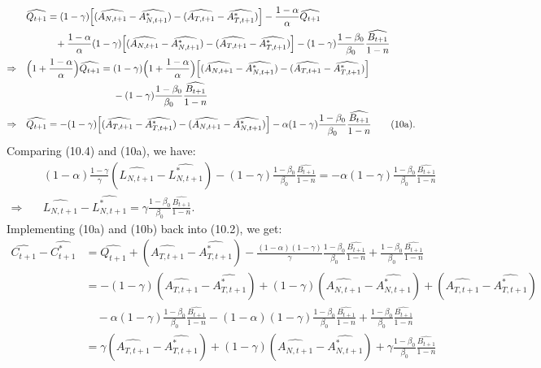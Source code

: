 \documentclass[a4paper,12pt]{article} %
\theoremstyle{nonitalic}
\begin{document}
\begin{align*}
    & \quad \widehat{Q_{t+1}} = (1-\gamma) \Bigl[ (\widehat{A_{N,t+1}} - \widehat{A_{N,t+1}^*}) - (\widehat{A_{T,t+1}} - \widehat{A_{T,t+1}^*}) \Bigr] - \frac{1-\alpha}{\alpha} \widehat{Q_{t+1}} \\
    &\quad\quad\quad\quad+ \frac{1-\alpha}{\alpha} (1-\gamma) \Bigl[ (\widehat{A_{N,t+1}} - \widehat{A_{N,t+1}^*}) - (\widehat{A_{T,t+1}} - \widehat{A_{T,t+1}^*}) \Bigr] - (1-\gamma) \frac{1-\beta_0}{\beta_0} \frac{\widehat{B_{t+1}}}{1-n} \\
    \Rightarrow & \quad \Bigl( 1 + \frac{1-\alpha}{\alpha} \Bigr) \widehat{Q_{t+1}} = (1-\gamma) \Bigl(1 + \frac{1-\alpha}{\alpha} \Bigr) \Bigl[ (\widehat{A_{N,t+1}} - \widehat{A_{N,t+1}^*}) - (\widehat{A_{T,t+1}} - \widehat{A_{T,t+1}^*}) \Bigr] \\
    &\quad\quad\quad\quad\quad\quad\quad\quad\quad\quad - (1-\gamma) \frac{1-\beta_0}{\beta_0} \frac{\widehat{B_{t+1}}}{1-n} \\
    \Rightarrow & \quad \widehat{Q_{t+1}} = -(1-\gamma) \Bigl[ (\widehat{A_{T,t+1}} - \widehat{A_{T,t+1}^*}) - (\widehat{A_{N,t+1}} - \widehat{A_{N,t+1}^*}) \Bigr] - \alpha (1-\gamma) \frac{1-\beta_0}{\beta_0} \frac{\widehat{B_{t+1}}}{1-n} \tag{10a}.
\end{align*}
Comparing (10.4) and (10a), we have:
\begin{align*}
    & \quad (1-\alpha) \frac{1-\gamma}{\gamma} (\widehat{L_{N,t+1}} - \widehat{L_{N,t+1}^*}) - (1-\gamma) \frac{1-\beta_0}{\beta_0} \frac{\widehat{B_{t+1}}}{1-n} = -\alpha (1-\gamma) \frac{1-\beta_0}{\beta_0} \frac{\widehat{B_{t+1}}}{1-n} \\
    \Rightarrow & \quad \widehat{L_{N,t+1}} - \widehat{L_{N,t+1}^*} = \gamma \frac{1-\beta_0}{\beta_0} \frac{\widehat{B_{t+1}}}{1-n} \tag{10b}.
\end{align*}
Implementing (10a) and (10b) back into (10.2), we get: 
\begin{align*}
    \widehat{C_{t+1}} - \widehat{C_{t+1}^*} &= \widehat{Q_{t+1}} + (\widehat{A_{T,t+1}} - \widehat{A_{T,t+1}^*}) - \frac{(1-\alpha)(1-\gamma)}{\gamma} \frac{1-\beta_0}{\beta_0} \frac{\widehat{B_{t+1}}}{1-n} + \frac{1-\beta_0}{\beta_0} \frac{\widehat{B_{t+1}}}{1-n} \\
    &= -(1-\gamma) (\widehat{A_{T,t+1}} - \widehat{A_{T,t+1}^*}) + (1-\gamma) (\widehat{A_{N,t+1}} - \widehat{A_{N,t+1}^*}) + (\widehat{A_{T,t+1}} - \widehat{A_{T,t+1}^*}) \\
    & \quad - \alpha (1-\gamma) \frac{1-\beta_0}{\beta_0} \frac{\widehat{B_{t+1}}}{1-n} - (1-\alpha) (1-\gamma) \frac{1-\beta_0}{\beta_0} \frac{\widehat{B_{t+1}}}{1-n} + \frac{1-\beta_0}{\beta_0} \frac{\widehat{B_{t+1}}}{1-n} \\
    &= \gamma(\widehat{A_{T,t+1}} - \widehat{A_{T,t+1}^*}) + (1-\gamma) (\widehat{A_{N,t+1}} - \widehat{A_{N,t+1}^*}) + \gamma \frac{1-\beta_0}{\beta_0} \frac{\widehat{B_{t+1}}}{1-n} \tag{10c}
\end{align*}
\end{document}
